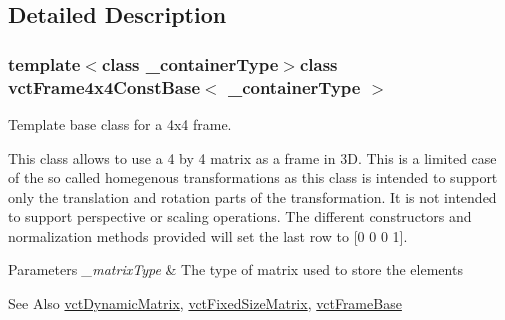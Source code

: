 \subsection{Detailed Description}
\subsubsection*{template$<$class \-\_\-container\-Type$>$class vct\-Frame4x4\-Const\-Base$<$ \-\_\-container\-Type $>$}

Template base class for a 4x4 frame. 

This class allows to use a 4 by 4 matrix as a frame in 3\-D. This is a limited case of the so called homegenous transformations as this class is intended to support only the translation and rotation parts of the transformation. It is not intended to support perspective or scaling operations. The different constructors and normalization methods provided will set the last row to \mbox{[}0 0 0 1\mbox{]}.


\begin{DoxyParams}{Parameters}
{\em \-\_\-matrix\-Type} & The type of matrix used to store the elements\\
\hline
\end{DoxyParams}
\begin{DoxySeeAlso}{See Also}
\hyperlink{classvct_dynamic_matrix}{vct\-Dynamic\-Matrix}, \hyperlink{classvct_fixed_size_matrix}{vct\-Fixed\-Size\-Matrix}, \hyperlink{classvct_frame_base}{vct\-Frame\-Base} 
\end{DoxySeeAlso}


